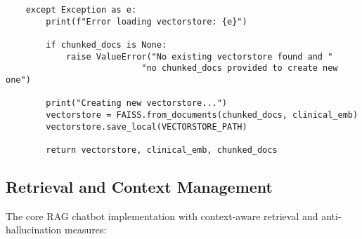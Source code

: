 \begin{verbatim}
    except Exception as e:
        print(f"Error loading vectorstore: {e}")
        
        if chunked_docs is None:
            raise ValueError("No existing vectorstore found and "
                           "no chunked_docs provided to create new one")
        
        print("Creating new vectorstore...")
        vectorstore = FAISS.from_documents(chunked_docs, clinical_emb)
        vectorstore.save_local(VECTORSTORE_PATH)
        
        return vectorstore, clinical_emb, chunked_docs
\end{verbatim}

\subsection{Retrieval and Context Management}

The core RAG chatbot implementation with context-aware retrieval and anti-hallucination measures:

